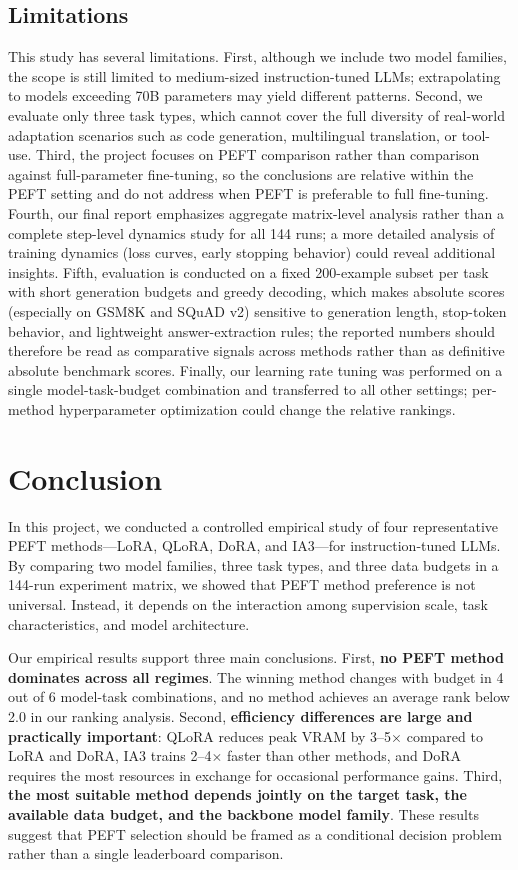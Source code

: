 \documentclass{article}
\begin{document}
\subsection{Limitations}

This study has several limitations. First, although we include two model families, the scope is still limited to medium-sized instruction-tuned LLMs; extrapolating to models exceeding 70B parameters may yield different patterns. Second, we evaluate only three task types, which cannot cover the full diversity of real-world adaptation scenarios such as code generation, multilingual translation, or tool-use. Third, the project focuses on PEFT comparison rather than comparison against full-parameter fine-tuning, so the conclusions are relative within the PEFT setting and do not address when PEFT is preferable to full fine-tuning. Fourth, our final report emphasizes aggregate matrix-level analysis rather than a complete step-level dynamics study for all 144 runs; a more detailed analysis of training dynamics (loss curves, early stopping behavior) could reveal additional insights. Fifth, evaluation is conducted on a fixed 200-example subset per task with short generation budgets and greedy decoding, which makes absolute scores (especially on GSM8K and SQuAD v2) sensitive to generation length, stop-token behavior, and lightweight answer-extraction rules; the reported numbers should therefore be read as comparative signals across methods rather than as definitive absolute benchmark scores. Finally, our learning rate tuning was performed on a single model-task-budget combination and transferred to all other settings; per-method hyperparameter optimization could change the relative rankings.

\section{Conclusion}

In this project, we conducted a controlled empirical study of four representative PEFT methods---LoRA, QLoRA, DoRA, and IA3---for instruction-tuned LLMs. By comparing two model families, three task types, and three data budgets in a 144-run experiment matrix, we showed that PEFT method preference is not universal. Instead, it depends on the interaction among supervision scale, task characteristics, and model architecture.

Our empirical results support three main conclusions. First, \textbf{no PEFT method dominates across all regimes}. The winning method changes with budget in 4 out of 6 model-task combinations, and no method achieves an average rank below 2.0 in our ranking analysis. Second, \textbf{efficiency differences are large and practically important}: QLoRA reduces peak VRAM by 3--5$\times$ compared to LoRA and DoRA, IA3 trains 2--4$\times$ faster than other methods, and DoRA requires the most resources in exchange for occasional performance gains. Third, \textbf{the most suitable method depends jointly on the target task, the available data budget, and the backbone model family}. These results suggest that PEFT selection should be framed as a conditional decision problem rather than a single leaderboard comparison.
\end{document}
